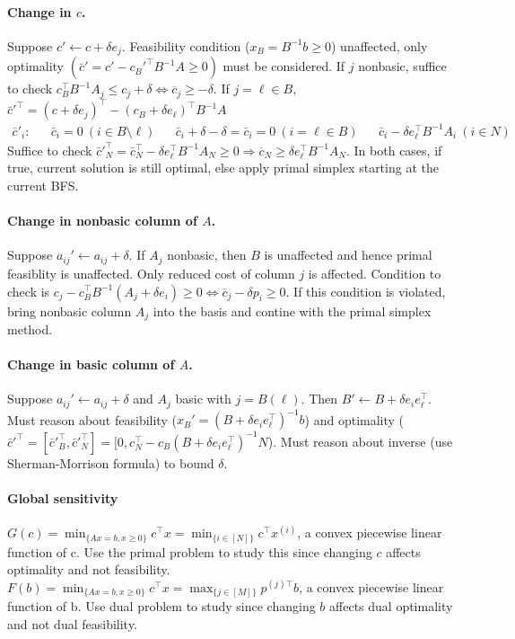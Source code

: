 \documentclass{article}
\begin{document}
\paragraph{Change in $c$.} Suppose $c'\leftarrow c + \delta e_j$. Feasibility condition ($x_B = B^{-1}b \geq 0$) unaffected, only optimality $(\bar c' = c' - c_B'^{\top}B^{-1}A \geq 0)$ must be considered. If $j$ nonbasic, suffice to check $c_B^\top B^{-1}A_j \leq c_j + \delta \iff \overline c_j \geq -\delta$. If $j = \ell\in B$, $\bar c'^\top = (c + \delta e_j)^\top - (c_B + \delta e_\ell)^\top B^{-1}A$ 
\begin{align*}
    \bar c'_i: &&
        \bar c_i = 0\ (i\in B\setminus \ell) &&
        \bar c_i + \delta - \delta = \bar c_i = 0\ (i = \ell\in B) &&
        \bar c_i - \delta e_\ell^\top B^{-1}A_i\ (i \in N)
\end{align*}
Suffice to check $\bar c'^\top_N = \bar c_N^\top - \delta e_\ell^\top B^{-1}A_N \geq 0 \Longrightarrow \overline c_N \geq \delta e_\ell^\top  B^{-1}A_N$. In both cases, if true, current solution is still optimal, else apply primal simplex starting at the current BFS. 

\paragraph{Change in nonbasic column of $A$.} Suppose $a_{ij}'\leftarrow a_{ij} + \delta$. If $A_j$ nonbasic, then $B$ is unaffected and hence primal feasiblity is unaffected. Only reduced cost of column $j$ is affected. Condition to check is $c_j - c_B^\top B^{-1}(A_j + \delta e_i)\geq 0 \iff \overline c_j - \delta p_i \geq 0$. If this condition is violated, bring nonbasic column $A_j$ into the basis and contine with the primal simplex method. 

\paragraph{Change in basic column of $A$.} Suppose $a_{ij}'\leftarrow a_{ij} + \delta$ and $A_j$ basic with $j=B(\ell)$. Then $B' \leftarrow B + \delta e_i e_\ell^\top$. Must reason about feasibility ($x_B' = (B + \delta e_i e_\ell^\top)^{-1}b$) and optimality ($\bar c'^\top = [\bar c'^\top_B, \bar c'^\top_N]= [0, c_N^\top - c_B(B + \delta e_i e_\ell^\top)^{-1}N$). Must reason about inverse (use Sherman-Morrison formula) to bound $\delta$.

\paragraph{Global sensitivity} $G(c) = \min_{\{Ax=b, x\geq 0\}}c^\top x = \min_{\{i\in[N]\}}c^\top x^{(i)}$, a convex piecewise linear function of c. Use the primal problem to study this since changing $c$ affects optimality and not feasibility. $F(b) = \min_{\{Ax=b, x\geq 0\}}c^\top x = \max_{\{j\in[M]\}}p^{(j)\top} b$, a convex piecewise linear function of b. Use dual problem to study since changing $b$ affects dual optimality and not dual feasibility.
\end{document}
